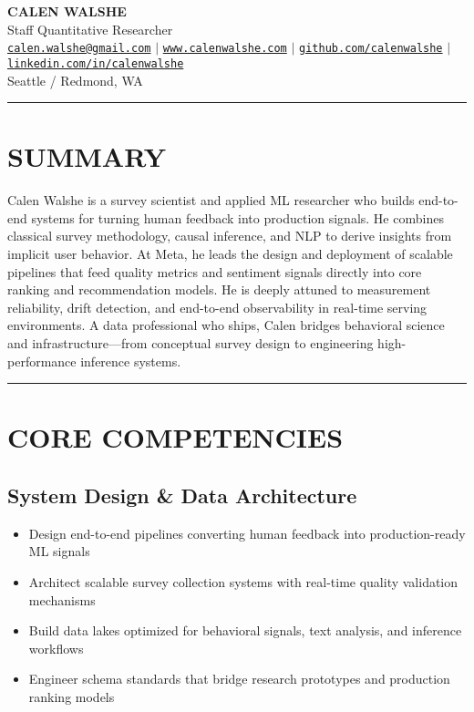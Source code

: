 \documentclass[11pt,a4paper]{article}
\newcommand{\sepline}{\noindent\rule{\textwidth}{0.5pt}\vspace{0.5em}}
\begin{document}
\begin{center}
    {\Huge\bfseries\color{darkblue} CALEN WALSHE}\\[0.3em]
    {\large Staff Quantitative Researcher}\\[0.5em]

    \href{mailto:calen.walshe@gmail.com}{\texttt{calen.walshe@gmail.com}} $\mid$
    \href{https://www.calenwalshe.com}{\texttt{www.calenwalshe.com}} $\mid$
    \href{https://github.com/calenwalshe}{\texttt{github.com/calenwalshe}} $\mid$
    \href{https://linkedin.com/in/calenwalshe}{\texttt{linkedin.com/in/calenwalshe}}\\[0.2em]

    {\color{mediumgray} Seattle / Redmond, WA}
\end{center}

\vspace{0.5em}
\sepline

\section*{SUMMARY}
Calen Walshe is a survey scientist and applied ML researcher who builds end-to-end systems for turning human feedback into production signals. He combines classical survey methodology, causal inference, and NLP to derive insights from implicit user behavior. At Meta, he leads the design and deployment of scalable pipelines that feed quality metrics and sentiment signals directly into core ranking and recommendation models. He is deeply attuned to measurement reliability, drift detection, and end-to-end observability in real-time serving environments. A data professional who ships, Calen bridges behavioral science and infrastructure—from conceptual survey design to engineering high-performance inference systems.

\vspace{0.5em}
\sepline

\section*{CORE COMPETENCIES}

\subsection*{System Design \& Data Architecture}
\begin{itemize}
    \item Design end-to-end pipelines converting human feedback into production-ready ML signals
    \item Architect scalable survey collection systems with real-time quality validation mechanisms
    \item Build data lakes optimized for behavioral signals, text analysis, and inference workflows
    \item Engineer schema standards that bridge research prototypes and production ranking models
\end{itemize}
\end{document}
